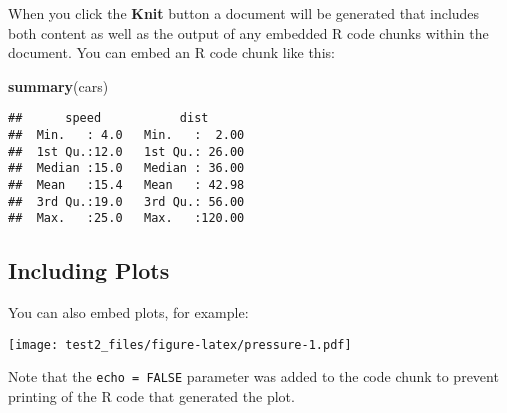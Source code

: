 \documentclass[]{article}
\newenvironment{Shaded}{\begin{snugshade}}{\end{snugshade}}
\newcommand{\KeywordTok}[1]{\textcolor[rgb]{0.13,0.29,0.53}{\textbf{#1}}}
\newcommand{\NormalTok}[1]{#1}
\begin{document}
When you click the \textbf{Knit} button a document will be generated
that includes both content as well as the output of any embedded R code
chunks within the document. You can embed an R code chunk like this:

\begin{Shaded}
\begin{Highlighting}[]
\KeywordTok{summary}\NormalTok{(cars)}
\end{Highlighting}
\end{Shaded}

\begin{verbatim}
##      speed           dist       
##  Min.   : 4.0   Min.   :  2.00  
##  1st Qu.:12.0   1st Qu.: 26.00  
##  Median :15.0   Median : 36.00  
##  Mean   :15.4   Mean   : 42.98  
##  3rd Qu.:19.0   3rd Qu.: 56.00  
##  Max.   :25.0   Max.   :120.00
\end{verbatim}

\subsection{Including Plots}\label{including-plots}

You can also embed plots, for example:

\texttt{[image: test2\_files/figure-latex/pressure-1.pdf]}

Note that the \texttt{echo\ =\ FALSE} parameter was added to the code
chunk to prevent printing of the R code that generated the plot.
\end{document}
